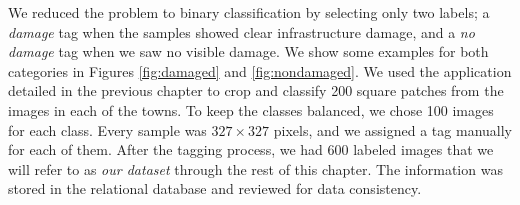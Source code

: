 We reduced the problem to binary classification by selecting only two labels; a \textit{damage} tag when the samples showed clear infrastructure damage, and a \textit{no damage} tag when we saw no visible damage. We show some examples for both categories in Figures \ref{fig:damaged} and \ref{fig:nondamaged}. We used the application detailed in the previous chapter to crop and classify 200 square patches from the images in each of the towns. To keep the classes balanced, we chose 100 images for each class. Every sample was $327\times327$ pixels, and we assigned a tag manually for each of them. After the tagging process, we had 600 labeled images that we will refer to as \textit{our dataset} through the rest of this chapter. The information was stored in the relational database and reviewed for data consistency.\\

